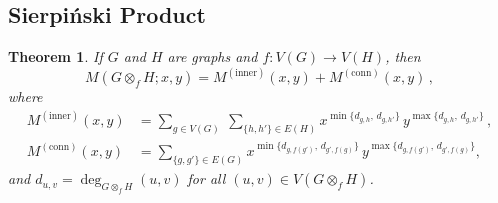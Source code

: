 \documentclass[letterpaper,12pt]{article}
\newtheorem{theorem}{Theorem}[section]
\begin{document}
\subsection{Sierpi\'{n}ski Product}
\label{sec:Sierpi}

\begin{theorem}
\label{thm:sierpinski-M}
If $G$ and $H$ are graphs and $f:V(G)\to V(H)$, then 
\begin{equation}
    M(G\otimes_f H;x,y)=M^{(\mathrm{inner})}(x,y)+M^{(\mathrm{conn})}(x,y)\,,
\end{equation}
where
\begin{align}
    M^{(\mathrm{inner})}(x,y)
& =
\sum_{g\in V(G)}\ \sum_{\{h,h'\}\in E(H)}
x^{\min\{d_{g,h},\,d_{g,h'}\}}\,
y^{\max\{d_{g,h},\,d_{g,h'}\}}\,,\\
M^{(\mathrm{conn})}(x,y)
& =
\sum_{\{g,g'\}\in E(G)}
x^{\min\{d_{g,f(g')},\,d_{g',f(g)}\}}\,
y^{\max\{d_{g,f(g')},\,d_{g',f(g)}\}},
\end{align}
and $d_{u,v}=\deg_{G\otimes_f H}(u,v)$ for all $(u,v)\in V(G\otimes_f H)$.
\end{theorem}
\end{document}
